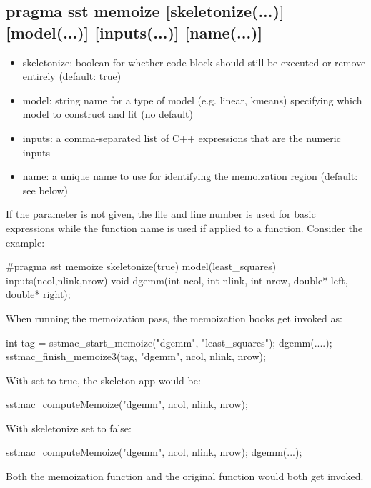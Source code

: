 \begin{CppCode}
struct least_squares : public regression model {
 FactoryRegister("least_squares", OperatingSystem::RegressionModel, least_squares)
\end{CppCode}

\subsection{pragma sst memoize [skeletonize(...)] [model(...)] [inputs(...)] [name(...)]}
\begin{itemize}
\item skeletonize: boolean for whether code block should still be executed or remove entirely (default: true)
\item model: string name for a type of model (e.g. linear, kmeans) specifying which model to construct and fit (no default)
\item inputs: a comma-separated list of C++ expressions that are the numeric inputs
\item name: a unique name to use for identifying the memoization region (default: see below)
\end{itemize}
If the  parameter is not given, the file and line number is used for basic expressions while the function name is used if applied to a function.
Consider the example:

\begin{CppCode}
#pragma sst memoize skeletonize(true) model(least_squares) inputs(ncol,nlink,nrow) 
void dgemm(int ncol, int nlink, int nrow, double* left, double* right);
\end{CppCode}
When running the memoization pass, the memoization hooks get invoked as:

\begin{CppCode}
int tag = sstmac_start_memoize("dgemm", "least_squares");
dgemm(....);
sstmac_finish_memoize3(tag, "dgemm", ncol, nlink, nrow);
\end{CppCode}
With  set to true, the skeleton app would be:

\begin{CppCode}
sstmac_computeMemoize("dgemm", ncol, nlink, nrow);
\end{CppCode}
With skeletonize set to false:

\begin{CppCode}
sstmac_computeMemoize("dgemm", ncol, nlink, nrow);
dgemm(...);
\end{CppCode}
Both the memoization function and the original function would both get invoked.

